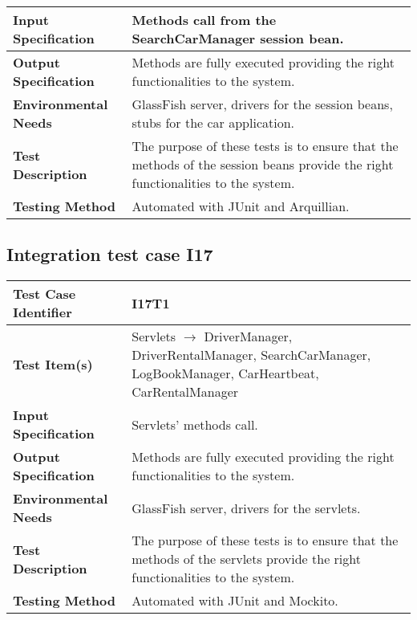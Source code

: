 \begin{tabular}{l p{}}
    \hline
    \textbf{Input Specification} &  Methods call from the SearchCarManager session bean. \\
    \hline
    \hline
    \textbf{Output Specification} & Methods are fully executed providing the right functionalities to the system.\\
    \hline
    \textbf{Environmental Needs} & GlassFish server, drivers for the session beans, stubs for the car application. \\
    \hline
    \textbf{Test Description} & The purpose of these tests is to ensure that the methods of the session beans provide the right functionalities
to the system.  \\
    \hline
    \textbf{Testing Method} & Automated with JUnit and Arquillian. \\
    \hline
\end{tabular}

\vspace{2em}

\subsection {Integration test case I17}

\indent

\vspace{1em}

\begin{tabular}{l p{}}
    \hline
    \textbf{Test Case Identifier} & I17T1\\
    \hline
    \textbf{Test Item(s)} & Servlets $\rightarrow$ DriverManager, DriverRentalManager, SearchCarManager, LogBookManager, CarHeartbeat, CarRentalManager \\
    \hline
    \textbf{Input Specification} &  Servlets' methods call. \\
    \hline
    \textbf{Output Specification} &  Methods are fully executed providing the right functionalities to the system.\\
    \hline
    \textbf{Environmental Needs} & GlassFish server, drivers for the servlets. \\
    \hline
    \textbf{Test Description} &  The purpose of these tests is to ensure that the methods of the servlets provide the right functionalities
to the system.  \\
    \hline
    \textbf{Testing Method} & Automated with JUnit and Mockito. \\
    \hline
\end{tabular}

